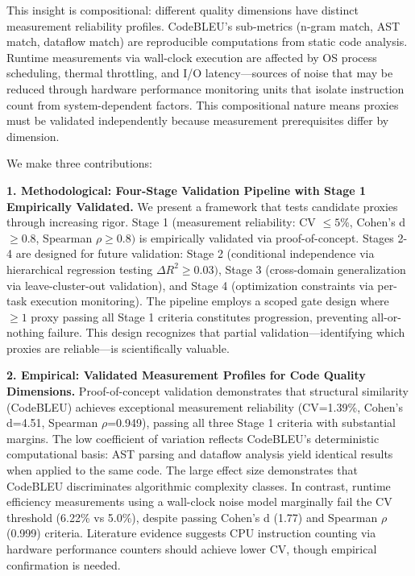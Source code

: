 This insight is compositional: different quality dimensions have distinct measurement reliability profiles. CodeBLEU's sub-metrics (n-gram match, AST match, dataflow match) are reproducible computations from static code analysis. Runtime measurements via wall-clock execution are affected by OS process scheduling, thermal throttling, and I/O latency---sources of noise that may be reduced through hardware performance monitoring units that isolate instruction count from system-dependent factors. This compositional nature means proxies must be validated independently because measurement prerequisites differ by dimension.

We make three contributions:

\textbf{1. Methodological: Four-Stage Validation Pipeline with Stage 1 Empirically Validated.} We present a framework that tests candidate proxies through increasing rigor. Stage 1 (measurement reliability: CV $\leq 5$\%, Cohen's d $\geq 0.8$, Spearman $\rho \geq 0.8)$ is empirically validated via proof-of-concept. Stages 2-4 are designed for future validation: Stage 2 (conditional independence via hierarchical regression testing $\Delta R^2 \geq 0.03)$, Stage 3 (cross-domain generalization via leave-cluster-out validation), and Stage 4 (optimization constraints via per-task execution monitoring). The pipeline employs a scoped gate design where $\geq 1$ proxy passing all Stage 1 criteria constitutes progression, preventing all-or-nothing failure. This design recognizes that partial validation---identifying which proxies are reliable---is scientifically valuable.

\textbf{2. Empirical: Validated Measurement Profiles for Code Quality Dimensions.} Proof-of-concept validation demonstrates that structural similarity (CodeBLEU) achieves exceptional measurement reliability (CV=1.39\%, Cohen's d=4.51, Spearman $\rho$=0.949), passing all three Stage 1 criteria with substantial margins. The low coefficient of variation reflects CodeBLEU's deterministic computational basis: AST parsing and dataflow analysis yield identical results when applied to the same code. The large effect size demonstrates that CodeBLEU discriminates algorithmic complexity classes. In contrast, runtime efficiency measurements using a wall-clock noise model marginally fail the CV threshold (6.22\% vs 5.0\%), despite passing Cohen's d (1.77) and Spearman $\rho$ (0.999) criteria. Literature evidence suggests CPU instruction counting via hardware performance counters should achieve lower CV, though empirical confirmation is needed.

